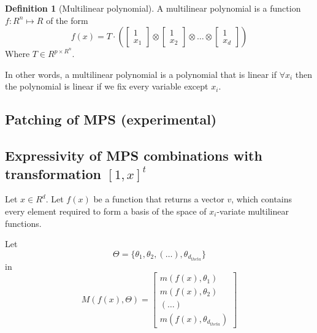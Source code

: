 \documentclass[11pt]{article}
\theoremstyle{definition}
\newtheorem{definition}{Definition}[section]
\theoremstyle{definition}
\begin{document}
\begin{definition}[Multilinear polynomial]
    A multilinear polynomial is a function $f: R^n \mapsto R$ of the form
    \begin{equation}
        f(x) = T \cdot \left( 
            \begin{bmatrix} 1 \\ x_1 \end{bmatrix} \otimes 
            \begin{bmatrix} 1 \\ x_2 \end{bmatrix} \otimes 
            \dots \otimes 
            \begin{bmatrix} 1 \\ x_d \end{bmatrix}
        \right)
    \end{equation}
    Where $T \in R^{p \times R^n }$. 
\end{definition}
In other words, a multilinear polynomial is a polynomial that is linear if  $\forall x_i$
then the polynomial is linear if we fix every variable except $x_i$.

\subsection{Patching of MPS (experimental)}



\subsection{Expressivity of MPS combinations with transformation $[1,x]^t$}
Let $x \in R^d$.
Let $f(x)$ be a function that returns a vector $v$, which contains every
element required to form a basis of the space of $x_i$-variate multilinear functions.

Let 
\begin{equation}
    \Theta = \{ \theta_1, \theta_2, (\dots), \theta_{d_{theta}} \}
\end{equation}
in
\begin{equation}
    M(f(x), \Theta)
    = 
    \begin{bmatrix}
        m(f(x), \theta_1) \\
        m(f(x), \theta_2) \\
        (\dots) \\
        m(f(x), \theta_{d_{theta}}) 
    \end{bmatrix}
\end{equation}
\end{document}
